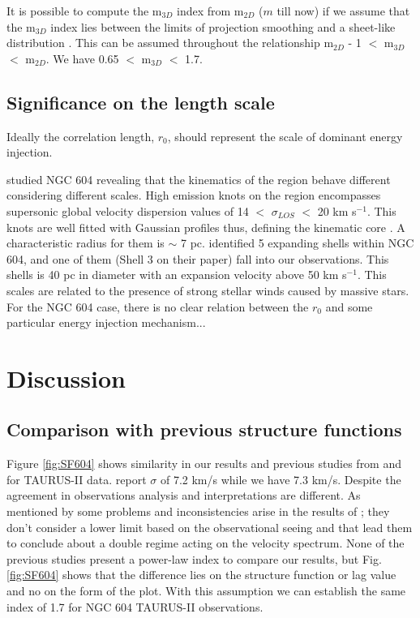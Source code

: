 \documentclass[fleqn,usenatbib, useAMS, a4paper]{mnras}
\begin{document}
It is possible to compute the m$_{3D}$ index from m$_{2D}$ ($m$ till now) if we assume that the m$_{3D}$ index lies between the limits of projection smoothing and a sheet-like distribution \citep{arthur2016turbulence}. This can be assumed throughout the relationship m$_{2D}$ - 1 $<$ m$_{3D}$ $<$ m$_{2D}$. We have 0.65 $<$ m$_{3D}$ $<$ 1.7.

\subsection{Significance on the length scale}

Ideally the correlation length, \(r_0\), should represent the scale of dominant energy injection. 

\citet{sabalisck1995supersonic} studied NGC 604 revealing that the kinematics of the region behave different considering different scales. High emission knots on the region encompasses supersonic global velocity dispersion values of 14 $<$ \(\sigma_{LOS}\) $<$ 20 km s\(^{-1}\). This knots are well fitted with Gaussian profiles thus, defining the kinematic core \citet{munoz1996}. A characteristic radius for them is \(\sim\) 7 pc. \citet{yang1996} identified 5 expanding shells within NGC 604, and one of them (Shell 3 on their paper) fall into our observations. This shells is 40 pc in diameter with an expansion velocity above 50 km s\(^{-1}\). This scales are related to the presence of strong stellar winds caused by massive stars. For the NGC 604 case, there is no clear relation between the \(r_0\) and some particular energy injection mechanism...







\section{Discussion}\label{sec:discussion}

\subsection{Comparison with previous structure functions}

Figure \ref{fig:SF604} shows similarity in our results and previous studies from \citet{tanco1997} and \citet{2019arXiv191203543M} for TAURUS-II data. \citep{2019arXiv191203543M} report $\sigma$ of 7.2 km/s while we have 7.3 km/s. Despite the agreement in observations analysis and interpretations are different. As mentioned by \citet{2019arXiv191203543M} some problems and inconsistencies arise in the results of \citet{tanco1997}; they don't consider a lower limit based on the observational seeing and that lead them to conclude about a double regime acting on the velocity spectrum. None of the previous studies present a power-law index to compare our results, but  Fig. \ref{fig:SF604} shows that the difference lies on the structure function or lag value and no on the form of the plot. With this assumption we can establish the same index of 1.7 for NGC 604 TAURUS-II observations.
\end{document}
